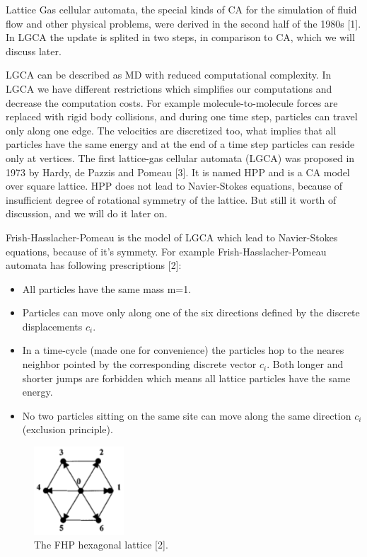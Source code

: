 Lattice Gas cellular automata, the special kinds of CA for the simulation of fluid flow and other physical problems, were derived in the second half of the 1980s [1]. In LGCA the update is splited in two steps, in comparison to CA, which we will discuss later.

LGCA can be described as MD with reduced computational complexity. In LGCA we have different restrictions which simplifies our computations and decrease the computation costs. For example molecule-to-molecule forces are replaced with rigid body collisions, and during one time step, particles can travel only along one edge.  The velocities are discretized too, what implies that all particles have the same energy and at the end of a time step particles can reside only at vertices.
The first lattice-gas cellular automata (LGCA) was proposed in 1973 by Hardy, de Pazzis and Pomeau [3]. It is named HPP and is a CA model over square lattice. HPP does not lead to Navier-Stokes equations, because of insufficient degree of rotational symmetry of the lattice. But still it worth of discussion, and we will do it later on.

Frish-Hasslacher-Pomeau is the model of LGCA which lead to Navier-Stokes equations, because of it's symmety. For example Frish-Hasslacher-Pomeau automata has following prescriptions [2]:

\begin{itemize}
\item All particles have the same mass m=1.
\item Particles can move only along one of the six directions defined by the discrete displacements $c_{i}$.
\item In a time-cycle (made one for convenience) the particles hop to the neares neighbor pointed by the corresponding discrete vector $c_{i}$. Both longer and shorter jumps are forbidden which means all lattice particles have the same energy.
\item No two particles sitting on the same site can move along the same direction $c_{i}$ (exclusion principle).
\end{itemize}

\begin{figure}[H]
  \centering
  \includegraphics[width=0.3\textwidth]{img/fig1.png}
  \caption{The FHP hexagonal lattice [2].}
\end{figure}

